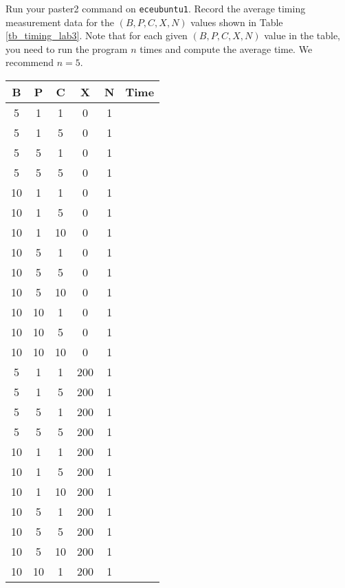 \begin{enumerate}
Run your paster2 command on \verb+eceubuntu1+. Record the average timing measurement data for the $(B, P, C, X, N)$ values shown in Table \ref{tb_timing_lab3}. Note that for each given $(B, P, C, X, N)$ value in the table, you need to run the program $n$ times and compute the average time. We recommend $n=5$.
          \begin{table}[h]
          \begin{center}
          \begin{tabular}{|c|c|c|c|c|c|}
          \hline
 B   & P   & C   & X   & N   &Time   \\ \hline 
5   & 1   & 1   & 0   & 1   &   \\ \hline
5   & 1   & 5   & 0   & 1   &   \\ \hline
5   & 5   & 1   & 0   & 1   &   \\ \hline
5   & 5   & 5   & 0   & 1   &   \\ \hline
10   & 1   & 1   & 0   & 1   &   \\ \hline
10   & 1   & 5   & 0   & 1   &   \\ \hline
10   & 1   & 10   & 0   & 1   &   \\ \hline
10   & 5   & 1   & 0   & 1   &   \\ \hline
10   & 5   & 5   & 0   & 1   &   \\ \hline
10   & 5   & 10   & 0   & 1   &   \\ \hline
10   & 10   & 1   & 0   & 1   &   \\ \hline
10   & 10   & 5   & 0   & 1   &   \\ \hline
10   & 10   & 10   & 0   & 1   &   \\ \hline
5   & 1   & 1   & 200   & 1   &   \\ \hline
5   & 1   & 5   & 200   & 1   &   \\ \hline
5   & 5   & 1   & 200   & 1   &   \\ \hline
5   & 5   & 5   & 200   & 1   &   \\ \hline
10   & 1   & 1   & 200   & 1   &   \\ \hline
10   & 1   & 5   & 200   & 1   &   \\ \hline
10   & 1   & 10   & 200   & 1   &   \\ \hline
10   & 5   & 1   & 200   & 1   &   \\ \hline
10   & 5   & 5   & 200   & 1   &   \\ \hline
10   & 5   & 10   & 200   & 1   &   \\ \hline
10   & 10   & 1   & 200   & 1   &   \\ \hline

\end{tabular}
\end{center}
\end{table}
\end{enumerate}
